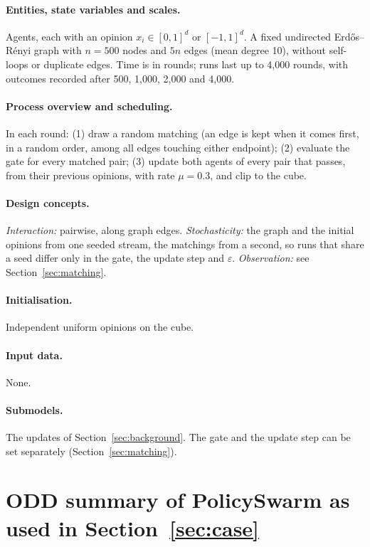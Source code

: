 \documentclass[11pt]{article}
\begin{document}
\paragraph{Entities, state variables and scales.} Agents, each with an opinion $x_i \in [0,1]^d$ or $[-1,1]^d$. A fixed undirected Erd\H{o}s--R\'enyi graph with $n=500$ nodes and $5n$ edges (mean degree 10), without self-loops or duplicate edges. Time is in rounds; runs last up to 4{,}000 rounds, with outcomes recorded after 500, 1{,}000, 2{,}000 and 4{,}000.

\paragraph{Process overview and scheduling.} In each round: (1) draw a random matching (an edge is kept when it comes first, in a random order, among all edges touching either endpoint); (2) evaluate the gate for every matched pair; (3) update both agents of every pair that passes, from their previous opinions, with rate $\mu = 0.3$, and clip to the cube.

\paragraph{Design concepts.} \emph{Interaction:} pairwise, along graph edges. \emph{Stochasticity:} the graph and the initial opinions from one seeded stream, the matchings from a second, so runs that share a seed differ only in the gate, the update step and $\varepsilon$. \emph{Observation:} see Section~\ref{sec:matching}.

\paragraph{Initialisation.} Independent uniform opinions on the cube.

\paragraph{Input data.} None.

\paragraph{Submodels.} The updates of Section~\ref{sec:background}. The gate and the update step can be set separately (Section~\ref{sec:matching}).

\section{ODD summary of PolicySwarm as used in Section~\ref{sec:case}}
\label{app:policyswarm}
\end{document}
